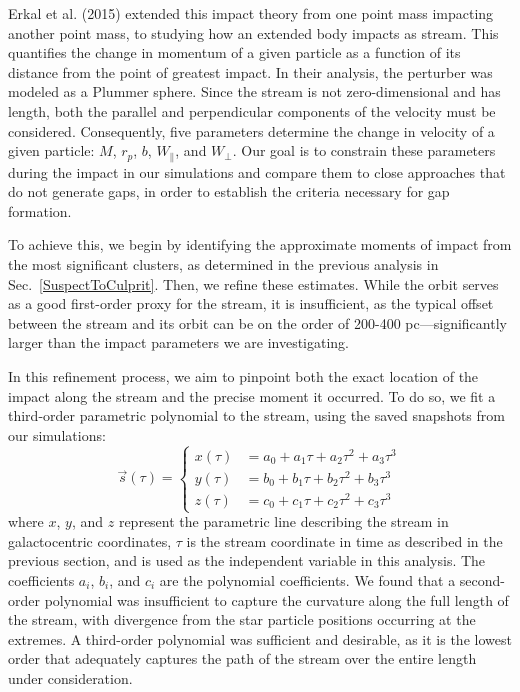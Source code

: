 \documentclass[draft]{aa}
\begin{document}
    Erkal et al. (2015) extended this impact theory from one point mass impacting another point mass, to studying how an extended body impacts as stream. This quantifies the change in momentum of a given particle as a function of its distance from the point of greatest impact. In their analysis, the perturber was modeled as a Plummer sphere. Since the stream is not zero-dimensional and has length, both the parallel and perpendicular components of the velocity must be considered. Consequently, five parameters determine the change in velocity of a given particle: $M$, $r_p$, $b$, $W_\parallel$, and $W_\perp$. Our goal is to constrain these parameters during the impact in our simulations and compare them to close approaches that do not generate gaps, in order to establish the criteria necessary for gap formation.

    To achieve this, we begin by identifying the approximate moments of impact from the most significant clusters, as determined in the previous analysis in Sec.~\ref{SuspectToCulprit}. Then, we refine these estimates. While the orbit serves as a good first-order proxy for the stream, it is insufficient, as the typical offset between the stream and its orbit can be on the order of 200-400 pc—significantly larger than the impact parameters we are investigating.

    In this refinement process, we aim to pinpoint both the exact location of the impact along the stream and the precise moment it occurred. To do so, we fit a third-order parametric polynomial to the stream, using the saved snapshots from our simulations:
    \begin{equation}
      \vec{s}(\tau) = 
      \left\{
        \begin{aligned}
          x(\tau) &= a_0 + a_1 \tau + a_2 \tau^2 + a_3 \tau^3 \\ 
          y(\tau) &= b_0 + b_1 \tau + b_2 \tau^2 + b_3 \tau^3 \\
          z(\tau) &= c_0 + c_1 \tau + c_2 \tau^2 + c_3 \tau^3
        \end{aligned}
      \right.
      \end{equation}  
    where $x$, $y$, and $z$ represent the parametric line describing the stream in galactocentric coordinates, $\tau$ is the stream coordinate in time as described in the previous section, and is used as the independent variable in this analysis. The coefficients $a_i$, $b_i$, and $c_i$ are the polynomial coefficients. We found that a second-order polynomial was insufficient to capture the curvature along the full length of the stream, with divergence from the star particle positions occurring at the extremes. A third-order polynomial was sufficient and desirable, as it is the lowest order that adequately captures the path of the stream over the entire length under consideration.
\end{document}
